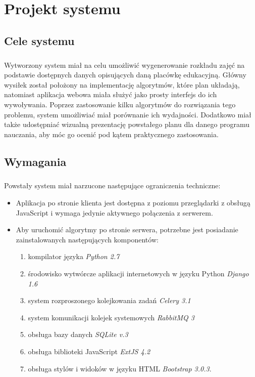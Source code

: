 \chapter{Projekt systemu}
\author{Filip Czajkowski}
\section{Cele systemu}
\paragraph{}Wytworzony system miał na celu umożliwić wygenerowanie rozkładu zajęć na podstawie dostępnych danych opisujących daną placówkę edukacyjną. Główny wysiłek został położony na implementację algorytmów, które plan układają, natomiast aplikacja webowa miała służyć jako prosty interfejs do ich wywoływania. Poprzez zastosowanie kilku algorytmów do rozwiązania tego problemu, system umożliwiać miał porównanie ich wydajności. Dodatkowo miał także udostępniać wizualną prezentację powstałego planu dla danego programu nauczania, aby móc go ocenić pod kątem praktycznego zastosowania.
\section{Wymagania}
\paragraph{}Powstały system miał narzucone następujące ograniczenia techniczne:
\begin{itemize}
\item Aplikacja po stronie klienta jest dostępna z poziomu przeglądarki z obsługą JavaScript i wymaga jedynie aktywnego połączenia z serwerem.
\item Aby uruchomić algorytmy po stronie serwera, potrzebne jest posiadanie zainstalowanych następujących komponentów:
\begin{enumerate}
\item kompilator języka \emph{Python 2.7}
\item środowisko wytwórcze aplikacji internetowych w języku Python \emph{Django 1.6}
\item system rozproszonego kolejkowania zadań \emph{Celery 3.1}
\item system komunikacji kolejek systemowych \emph{RabbitMQ 3}
\item obsługa bazy danych \emph{SQLite v.3}
\item obsługa biblioteki JavaScript \emph{ExtJS 4.2}
\item obsługa stylów i widoków w języku HTML \emph{Bootstrap 3.0.3}.
\end{enumerate}
\end{itemize}
